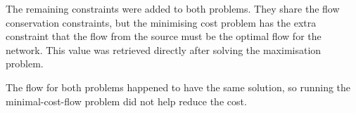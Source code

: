 \documentclass[a4paper, 10pt, oneside, article]{memoir}
\begin{document}
The remaining constraints were added to both problems. They share the
flow conservation constraints, but the minimising cost problem has the
extra constraint that the flow from the source must be the optimal
flow for the network. This value was retrieved directly after solving
the maximisation problem.

The flow for both problems happened to have the same solution, so
running the minimal-cost-flow problem did not help reduce the cost.



\end{document}
